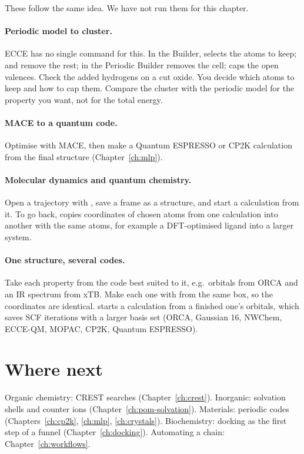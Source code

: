 These follow the same idea. We have not run them for this chapter.

\paragraph{Periodic model to cluster.} ECCE has no single command for this. In the Builder,  selects the atoms to keep;  and  remove the rest;  in the Periodic Builder removes the cell;  caps the open valences. Check the added hydrogens on a cut oxide. You decide which atoms to keep and how to cap them. Compare the cluster with the periodic model for the property you want, not for the total energy.

\paragraph{MACE to a quantum code.} Optimise with MACE, then make a Quantum ESPRESSO or CP2K calculation from the final structure (Chapter~\ref{ch:mlp}).

\paragraph{Molecular dynamics and quantum chemistry.} Open a trajectory with , save a frame as a structure, and start a calculation from it. To go back,  copies coordinates of chosen atoms from one calculation into another with the same atoms, for example a DFT-optimised ligand into a larger system.

\paragraph{One structure, several codes.} Take each property from the code best suited to it, e.g.\ orbitals from ORCA and an IR spectrum from xTB. Make each one with  from the same box, so the coordinates are identical.  starts a calculation from a finished one's orbitals, which saves SCF iterations with a larger basis set (ORCA, Gaussian 16, NWChem, ECCE-QM, MOPAC, CP2K, Quantum ESPRESSO).

\section{Where next}
Organic chemistry: CREST searches (Chapter~\ref{ch:crest}). Inorganic: solvation shells and counter ions (Chapter~\ref{ch:pom-solvation}). Materials: periodic codes (Chapters~\ref{ch:cp2k}, \ref{ch:mlp}, \ref{ch:crystals}). Biochemistry: docking as the first step of a funnel (Chapter~\ref{ch:docking}). Automating a chain: Chapter~\ref{ch:workflows}.
